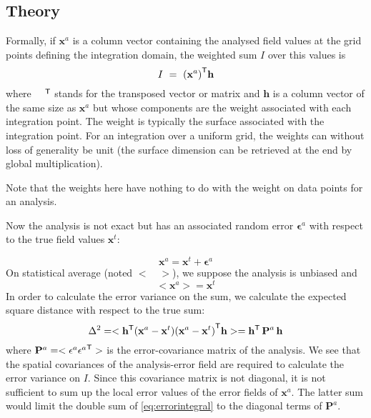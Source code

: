 \subsection{Theory}

Formally, if $\mathbf{x}^a$ is a column vector containing the analysed field values at the grid
points defining the integration domain, the weighted sum $I$ over this values is
\begin{equation}
I~=~{(\mathbf{x}^a)}^\mathsf{T} \mathbf{h}
\end{equation}
where ${\quad}^\mathsf{T}$ stands for the transposed vector or matrix and $\mathbf{h}$ is a column vector of the same size as
$\mathbf{x}^a$ but whose components are the weight associated with each integration point. The weight is typically the surface associated with
the integration point. For an integration over a uniform grid, the weights can without loss of generality be unit (the surface dimension can be retrieved at the end by global multiplication). 

Note that the weights here have nothing to do with the weight on data points for an analysis.

Now the analysis is not exact but has an associated random error $\mathbf{\epsilon}^a$ with respect to the true
field values $\mathbf{x}^t$:

\begin{equation}
{\mathbf{x}^a} = \mathbf{x}^t + \mathbf{\epsilon}^a
\end{equation}
On statistical average (noted $< \quad >$), we suppose the analysis is unbiased and
\begin{equation}
<{\mathbf{x}^a}> = \mathbf{x}^t 
\end{equation}
In order to calculate the error variance on the sum, we calculate the expected square distance with respect to the true sum:
\begin{equation}
\Delta^2 = < {\mathbf{h}}^\mathsf{T}( {\mathbf{x}^a} - \mathbf{x}^t) {({\mathbf{x}^a} - \mathbf{x}^t )}^\mathsf{T} \mathbf{h} > = {\mathbf{h}}^\mathsf{T} \, \mathbf{P}^a \, \mathbf{h}
\label{eq:errorintegral}
\end{equation}
where $\mathbf{P}^a = <\mathbf{\epsilon}^a {\mathbf{\epsilon}^a}^\mathsf{T} >$ is the error-covariance matrix of the analysis.
We see that the spatial covariances of the analysis-error field are required to calculate the error variance on $I$. Since this
covariance matrix is not diagonal, it is not sufficient to sum up the local error values of the error fields of $\mathbf{x}^a$. The latter sum would limit
the double sum of \eqref{eq:errorintegral} to the diagonal terms of $\mathbf{P}^a$.


